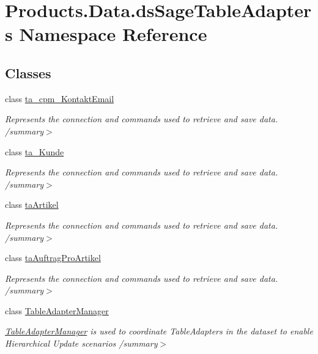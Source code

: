 \hypertarget{namespace_products_1_1_data_1_1ds_sage_table_adapters}{}\section{Products.\+Data.\+ds\+Sage\+Table\+Adapters Namespace Reference}
\label{namespace_products_1_1_data_1_1ds_sage_table_adapters}
\subsection*{Classes}
\begin{DoxyCompactItemize}
\item 
class \hyperlink{class_products_1_1_data_1_1ds_sage_table_adapters_1_1ta__cpm___kontakt_email}{ta\+\_\+cpm\+\_\+\+Kontakt\+Email}
\begin{DoxyCompactList}\small\item\em Represents the connection and commands used to retrieve and save data. /summary$>$ \end{DoxyCompactList}\item 
class \hyperlink{class_products_1_1_data_1_1ds_sage_table_adapters_1_1ta___kunde}{ta\+\_\+\+Kunde}
\begin{DoxyCompactList}\small\item\em Represents the connection and commands used to retrieve and save data. /summary$>$ \end{DoxyCompactList}\item 
class \hyperlink{class_products_1_1_data_1_1ds_sage_table_adapters_1_1ta_artikel}{ta\+Artikel}
\begin{DoxyCompactList}\small\item\em Represents the connection and commands used to retrieve and save data. /summary$>$ \end{DoxyCompactList}\item 
class \hyperlink{class_products_1_1_data_1_1ds_sage_table_adapters_1_1ta_auftrag_pro_artikel}{ta\+Auftrag\+Pro\+Artikel}
\begin{DoxyCompactList}\small\item\em Represents the connection and commands used to retrieve and save data. /summary$>$ \end{DoxyCompactList}\item 
class \hyperlink{class_products_1_1_data_1_1ds_sage_table_adapters_1_1_table_adapter_manager}{Table\+Adapter\+Manager}
\begin{DoxyCompactList}\small\item\em \hyperlink{class_products_1_1_data_1_1ds_sage_table_adapters_1_1_table_adapter_manager}{Table\+Adapter\+Manager} is used to coordinate Table\+Adapters in the dataset to enable Hierarchical Update scenarios /summary$>$ \end{DoxyCompactList}\item 

\end{DoxyCompactItemize}
